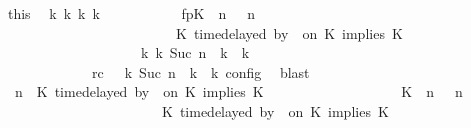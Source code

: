 \begin{isabellebody}
\ this\ \isamarkupfalse%
\ {\isasymGamma}\isactrlsub k\ {\isasymPsi}\isactrlsub k\ {\isasymPhi}\isactrlsub k\ k\isanewline
\ \ \ \ \ \ \ \ \ \ \ fp{\isacharcolon}{\isacartoucheopen}{\isacharparenleft}{\isacharparenleft}{\isacharparenleft}K\ {\isasymnot}{\isasymUp}\ n{\isacharparenright}\ {\isacharhash}\ {\isasymGamma}{\isacharparenright}{\isacharcomma}\ n\isanewline
\ \ \ \ \ \ \ \ \ \ \ \ \ \ \ \ \ \ \ \ \ \ {\isasymturnstile}\ {\isasymPsi}\ {\isasymtriangleright}\ {\isacharparenleft}{\isacharparenleft}K\ time{\isacharminus}delayed\ by\ {\isasymdelta}{\isasymtau}\ on\ K\ implies\ K\ {\isacharhash}\ {\isasymPhi}{\isacharparenright}{\isacharparenright}\isanewline
\ \ \ \ \ \ \ \ \ \ \ \ \ \ \ \ \ \ \ \ {\isasymhookrightarrow}\isactrlbsup k\isactrlesup \ {\isacharparenleft}{\isasymGamma}\isactrlsub k{\isacharcomma}\ Suc\ n\ {\isasymturnstile}\ {\isasymPsi}\isactrlsub k\ {\isasymtriangleright}\ {\isasymPhi}\isactrlsub k{\isacharparenright}{\isacartoucheclose}\isanewline
\ \ \ \ \ \ \ \ \ \ \ \ \ rc{\isacharcolon}{\isacartoucheopen}{\isasymrho}\ {\isasymin}\ {\isasymlbrakk}\ {\isasymGamma}\isactrlsub k{\isacharcomma}\ Suc\ n\ {\isasymturnstile}\ {\isasymPsi}\isactrlsub k\ {\isasymtriangleright}\ {\isasymPhi}\isactrlsub k\ {\isasymrbrakk}\isactrlsub c\isactrlsub o\isactrlsub n\isactrlsub f\isactrlsub i\isactrlsub g{\isacartoucheclose}\ \isamarkupfalse%
\ blast\isanewline
\ \ \ \ \ \ \ \ \isamarkupfalse%
\ {\isacartoucheopen}{\isacharparenleft}{\isasymGamma}{\isacharcomma}\ n\ {\isasymturnstile}\ {\isacharparenleft}{\isacharparenleft}K\ time{\isacharminus}delayed\ by\ {\isasymdelta}{\isasymtau}\ on\ K\ implies\ K\ {\isacharhash}\ {\isasymPsi}{\isacharparenright}\ {\isasymtriangleright}\ {\isasymPhi}{\isacharparenright}\isanewline
\ \ \ \ \ \ \ \ \ \ \ \ \ \ {\isasymhookrightarrow}\ {\isacharparenleft}{\isacharparenleft}{\isacharparenleft}K\ {\isasymnot}{\isasymUp}\ n{\isacharparenright}\ {\isacharhash}\ {\isasymGamma}{\isacharparenright}{\isacharcomma}\ n\isanewline
\ \ \ \ \ \ \ \ \ \ \ \ \ \ \ \ \ \ \ \ {\isasymturnstile}\ {\isasymPsi}\ {\isasymtriangleright}\ {\isacharparenleft}{\isacharparenleft}K\ time{\isacharminus}delayed\ by\ {\isasymdelta}{\isasymtau}\ on\ K\ implies\ K\ {\isacharhash}\ {\isasymPhi}{\isacharparenright}{\isacharparenright}{\isacartoucheclose}\isanewline

\end{isabellebody}
